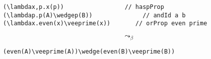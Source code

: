 \begin{lstlisting}[language=MMT]
(\lambdax,p.x(p))                 // haspProp
(\lambdap.p(A)\wedgep(B))              // andId a b
(\lambdax.even(x)\veeprime(x))       // orProp even prime
\end{lstlisting}

$$\leadsto_\beta$$

\begin{lstlisting}[language=MMT]
(even(A)\veeprime(A))\wedge(even(B)\veeprime(B))
\end{lstlisting}
